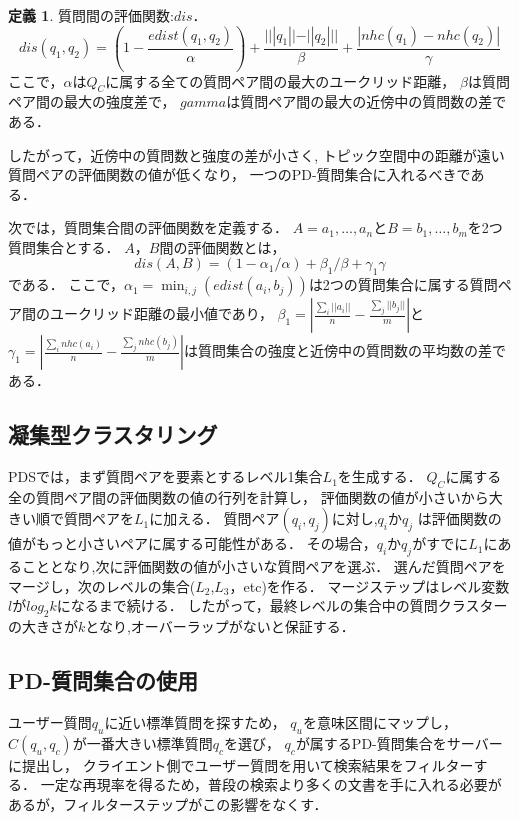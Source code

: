 \documentclass[master]{suribt}
\theoremstyle{definition}
\newtheorem{defi}[thm]{定義}
\begin{document}
 \begin{defi}{質問間の評価関数:$dis$．}
  \begin{equation}
  	dis(q_1,q_2) = (1 - \frac{edist(q_1,q_2)}{\alpha}) + \frac{|||q_1|| - ||q_2|| |}{\beta} + \frac{|nhc(q_1) -nhc(q_2)|}{\gamma}
  \end{equation}
  ここで，$\alpha$は$Q_C$に属する全ての質問ペア間の最大のユークリッド距離，
  $\beta$は質問ペア間の最大の強度差で，
  $gamma$は質問ペア間の最大の近傍中の質問数の差である．
 \end{defi}
 
 したがって，近傍中の質問数と強度の差が小さく,
 トピック空間中の距離が遠い質問ペアの評価関数の値が低くなり，
 一つのPD-質問集合に入れるべきである．

 次では，質問集合間の評価関数を定義する．
 $A = {a_1, \dots , a_n}$と$B = {b_1 , \dots , b_m}$を2つ質問集合とする．
 $A$，$B$間の評価関数とは，
 \begin{equation}
    dis(A,B) = (1 - \alpha_1 / \alpha) + \beta_1 / \beta + \gamma_1 \gamma
 \end{equation}
 である．
 ここで，$\alpha_1 = \min_{i,j}(edist(a_i,b_j))$は2つの質問集合に属する質問ペア間のユークリッド距離の最小値であり，
 $\beta_1 = |\frac{\sum_i||a_i||}{n} - \frac{\sum_j||b_j||}{m}|$と
 $\gamma_1 = |\frac{\sum_inhc(a_i)}{n} - \frac{\sum_jnhc(b_j)}{m}|$は質問集合の強度と近傍中の質問数の平均数の差である．
 
 \subsection{凝集型クラスタリング}
 PDSでは，まず質問ペアを要素とするレベル1集合$L_1$を生成する．
 $Q_C$に属する全の質問ペア間の評価関数の値の行列を計算し，
 評価関数の値が小さいから大きい順で質問ペアを$L_1$に加える．
 質問ペア$(q_i,q_j)$に対し,$q_i$か$q_j$ は評価関数の値がもっと小さいペアに属する可能性がある．
 その場合，$q_i$か$q_j$がすでに$L_1$にあることとなり,次に評価関数の値が小さいな質問ペアを選ぶ．
 選んだ質問ペアをマージし，次のレベルの集合($L_2$,$L_3$，etc)を作る．
 マージステップはレベル変数$l$が$log_2k$になるまで続ける．
 したがって，最終レベルの集合中の質問クラスターの大きさが$k$となり,オーバーラップがないと保証する．

 \subsection{PD-質問集合の使用}
 ユーザー質問$q_u$に近い標準質問を探すため，
 $q_u$を意味区間にマップし，
 $C(q_u,q_c)$が一番大きい標準質問$q_c$を選び，
 $q_c$が属するPD-質問集合をサーバーに提出し，
 クライエント側でユーザー質問を用いて検索結果をフィルターする．
 一定な再現率を得るため，普段の検索より多くの文書を手に入れる必要があるが，フィルターステップがこの影響をなくす．
\end{document}
